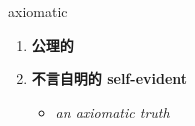 
\begin{frame}
{\huge axiomatic}
\begin{center}
\begin{enumerate}\Large
  \item \textbf{公理的}
  \item \textbf{不言自明的 self-evident}
  \begin{itemize}
    \item \em{\Large{an axiomatic truth}}
  \end{itemize}
\end{enumerate}
\end{center}
\end{frame}
